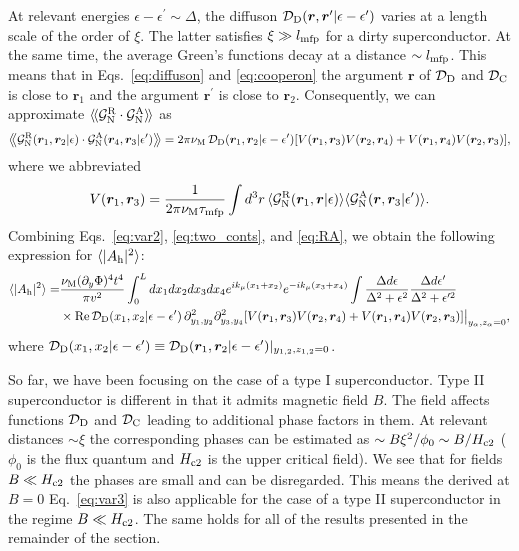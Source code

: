 \documentclass[pra,aps,a4paper,twocolumn,superscriptaddress,longbibliography]{revtex4-2}
\newcommand{\rngl}{\rangle\hspace{-0.05cm}\rangle}
\newcommand{\lngl}{\langle\hspace{-0.05cm}\langle}
\newcommand{\Rngl}{\big\rangle\hspace{-0.085cm}\big\rangle}
\newcommand{\Lngl}{\big\langle\hspace{-0.085cm}\big\langle}
\newcommand{\difz}{{\cal D}_{\rm D}}
\newcommand{\coop}{{\cal D}_{\rm C}}
\newcommand{\lprox}{L}
\newcommand{\he}{A_{\rm h}}
\newcommand{\xic}{\xi}
\newcommand{\GR}{{\cal G}^{\rm R}_{\rm N}}
\newcommand{\GA}{{\cal G}^{\rm A}_{\rm N}}
\begin{document}
At relevant energies $\epsilon - \epsilon^\prime \sim \Delta$, the diffuson ${\difz}({\bm r},{\bm r}^\prime|\epsilon - \epsilon^\prime)$ varies at a length scale of the order of $\xic$. The latter satisfies $\xic \gg l_{\rm mfp}$ for a dirty superconductor. At the same time, the average Green's functions decay at a distance $\sim l_{\rm mfp}$. This means that in Eqs.~\eqref{eq:diffuson} and \eqref{eq:cooperon} the argument ${\bm r}$ of $\difz$ and $\coop$ is close to ${\bm r}_1$ and the argument ${\bm r}^\prime$ is close to ${\bm r}_2$. Consequently, we can approximate $\lngl \GR \cdot \GA \rngl$ as
\begin{align}\label{eq:RA}
    \Lngl \GR ({\bm r}_1,{\bm r}_2|\epsilon)\cdot \GA({\bm r}_4, {\bm r}_3|\epsilon^\prime)\Rngl
    = 2\pi \nu_{\rm M}\,{\difz}({\bm r}_1, {\bm r}_2|\epsilon - \epsilon^\prime) [V({\bm r}_1, {\bm r}_3)V({\bm r}_2, {\bm r}_4) + V({\bm r}_1, {\bm r}_4)V({\bm r}_2, {\bm r}_3)], 
\end{align}
where we abbreviated
\begin{equation}\label{eq:vertex}
    V({\bm r}_1, {\bm r}_3) = \frac{1}{2\pi\nu_{\rm M} \tau_{\rm mfp}}\int d^3r\,\langle \GR({\bm r}_{1},{\bm r}|\epsilon)\rangle\langle \GA({\bm r},{\bm r}_3|\epsilon^{\prime})\rangle.
\end{equation}
Combining Eqs.~\eqref{eq:var2}, \eqref{eq:two_conts}, and \eqref{eq:RA}, we obtain the following expression for $\langle |\he|^2 \rangle$:
\begin{align}\label{eq:var3}
   \langle |\he|^2 \rangle = & \frac{\nu_{\rm M}(\partial_y \Phi)^4 t^4}{\pi v^2}\int^{\lprox}_{0} dx_{1}dx_{2}dx_{3}dx_{4}e^{ik_\mu(x_1 +x_2)}e^{-ik_\mu(x_3 + x_4)}\int \frac{\Delta d\epsilon}{\Delta^2 +\epsilon^2} \frac{\Delta d\epsilon^\prime}{\Delta^2+\epsilon^{\prime 2}} \notag\\
    &\times{\rm Re}\,{\difz}(x_1,x_2|\epsilon - \epsilon^\prime)\,\partial^2_{y_1,y_2}\partial^2_{y_3, y_4}[V({\bm r}_1, {\bm r}_3)V({\bm r}_2, {\bm r}_4) + V({\bm r}_1, {\bm r}_4)V({\bm r}_2, {\bm r}_3)]\big|_{y_\alpha, z_\alpha = 0},
\end{align}
where ${\difz}(x_1,x_2|\epsilon - \epsilon^\prime) \equiv {\difz}(\bm r_1,\bm r_2|\epsilon - \epsilon^\prime)|_{y_{1,2},z_{1,2} = 0}$.

So far, we have been focusing on the case of a type I superconductor. 
Type II superconductor is different in that it admits magnetic field $B$.
The field affects functions ${\difz}$ and ${\coop}$ leading to additional phase factors in them. At relevant distances $\sim \xic$ the corresponding phases can be estimated as $\sim B \xic^2 / \phi_0 \sim B / H_{\rm c2}$ ($\phi_0$ is the flux quantum and $H_{\rm c2}$ is the upper critical field).
We see that for fields $B \ll H_{\rm c2}$ the phases are small and can be disregarded.
This means the derived at $B = 0$ Eq.~\eqref{eq:var3} is also applicable for the case of a type II superconductor in the regime $B \ll H_{\rm c2}$.
The same holds for all of the results presented in the remainder of the section.
\end{document}
